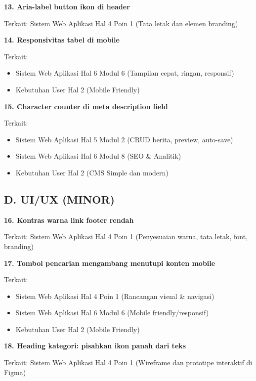 \documentclass[12pt,a4paper]{article}
\begin{document}
\textbf{13. Aria-label button ikon di header}

Terkait: Sistem Web Aplikasi Hal 4 Poin 1 (Tata letak dan elemen branding)

\textbf{14. Responsivitas tabel di mobile}

Terkait:
\begin{itemize}[topsep=0pt, partopsep=0pt, itemsep=2pt]
    \item Sistem Web Aplikasi Hal 6 Modul 6 (Tampilan cepat, ringan, responsif)
    \item Kebutuhan User Hal 2 (Mobile Friendly)
\end{itemize}

\textbf{15. Character counter di meta description field}

Terkait:
\begin{itemize}[topsep=0pt, partopsep=0pt, itemsep=2pt]
    \item Sistem Web Aplikasi Hal 5 Modul 2 (CRUD berita, preview, auto-save)
    \item Sistem Web Aplikasi Hal 6 Modul 8 (SEO \& Analitik)
    \item Kebutuhan User Hal 2 (CMS Simple dan modern)
\end{itemize}

\subsection*{D. UI/UX (MINOR)}

\textbf{16. Kontras warna link footer rendah}

Terkait: Sistem Web Aplikasi Hal 4 Poin 1 (Penyesuaian warna, tata letak, font, branding)

\textbf{17. Tombol pencarian mengambang menutupi konten mobile}

Terkait:
\begin{itemize}[topsep=0pt, partopsep=0pt, itemsep=2pt]
    \item Sistem Web Aplikasi Hal 4 Poin 1 (Rancangan visual \& navigasi)
    \item Sistem Web Aplikasi Hal 6 Modul 6 (Mobile friendly/responsif)
    \item Kebutuhan User Hal 2 (Mobile Friendly)
\end{itemize}

\textbf{18. Heading kategori: pisahkan ikon panah dari teks}

Terkait: Sistem Web Aplikasi Hal 4 Poin 1 (Wireframe dan prototipe interaktif di Figma)
\end{document}
